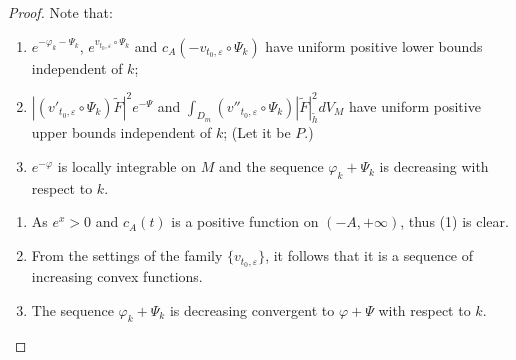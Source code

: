 \begin{proof}
Note that:
\begin{tcolorbox}[colback=Emerald!10,colframe=cyan!40!black,left=2mm,right=2mm,title=\textbf{NOTATION!!!}]
  \begin{enumerate}[label=(\arabic*)]
  \item $e^{-\varphi_{k}-\Psi_{k}}$,
$e^{v_{t_{0},\varepsilon}\circ\Psi_{k}}$ and
$c_{A}(-v_{t_{0},\varepsilon}\circ\Psi_{k})$ have uniform positive
lower bounds independent of $k$;
\item $|(v'_{t_{0},\varepsilon}\circ\Psi_{k})\widetilde{F}|^{2}e^{-\Psi}$
and $\int_{D_m}(v''_{t_0,\varepsilon}\circ{\Psi_{k}})|
\tilde{F}|^2_{\tilde{h}}dV_M$ have uniform positive upper bounds
independent of $k$; (Let it be $P$.)
\item $e^{-\varphi}$ is locally integrable on $M$ and the sequence
$\varphi_{k}+\Psi_{k}$ is decreasing with respect to $k$.
\end{enumerate}
\tcblower
    \begin{remark}
  \begin{enumerate}[label=(\roman*)]
    \item As $e^x>0$ and $c_A(t)$ is a positive function on $(-A,+\infty)$, thus (1) is clear. 
    \item From the settings of the family $\{v_{t_0,\varepsilon}\}$, it follows that it is a sequence of increasing convex functions. 
    \item The sequence $\varphi_{k}+\Psi_{k}$ is decreasing convergent to
    $\varphi+\Psi$ with respect to $k$.
  \end{enumerate}
\end{remark}
  \end{tcolorbox}


\end{proof}
